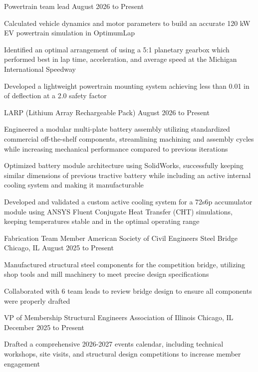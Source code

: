 {\begin{cventries}
  \cventry
    {Powertrain team lead}
    {}
    {}
    {August 2026 to Present}
    {
      \begin{cvitems}
        \item {Calculated vehicle dynamics and motor parameters to build an accurate 120 kW EV powertrain simulation in OptimumLap}
        \item {Identified an optimal arrangement of using a 5:1 planetary gearbox which performed best in lap time, acceleration, and average speed at the Michigan International Speedway}
        \item {Developed a lightweight powertrain mounting system achieving less than 0.01 in of deflection at a 2.0 safety factor}
      \end{cvitems}
    }

  \cventry
    {LARP (Lithium Array Rechargeable Pack)}
    {}
    {}
    {August 2026 to Present}
    {
      \begin{cvitems}
        \item {Engineered a modular multi-plate battery assembly utilizing standardized commercial off-the-shelf components, streamlining machining and assembly cycles while increasing mechanical performance compared to previous iterations}
        \item {Optimized battery module architecture using SolidWorks, successfully keeping similar dimensions of previous tractive battery while including an active internal cooling system and making it manufacturable}
        \item {Developed and validated a custom active cooling system for a 72s6p accumulator module using ANSYS Fluent Conjugate Heat Transfer (CHT) simulations, keeping temperatures stable and in the optimal operating range}
      \end{cvitems}
    }

  \cventry
    {Fabrication Team Member}
    {American Society of Civil Engineers Steel Bridge}
    {Chicago, IL}
    {August 2025 to Present}
    {
      \begin{cvitems}
        \item {Manufactured structural steel components for the competition bridge, utilizing shop tools and mill machinery to meet precise design specifications}
        \item {Collaborated with 6 team leads to review bridge design to ensure all components were properly drafted}
      \end{cvitems}
    }

  \cventry
    {VP of Membership}
    {Structural Engineers Association of Illinois}
    {Chicago, IL}
    {December 2025 to Present}
    {
      \begin{cvitems}
        \item {Drafted a comprehensive 2026-2027 events calendar, including technical workshops, site visits, and structural design competitions to increase member engagement}
      \end{cvitems}
    }


\end{cventries}}
